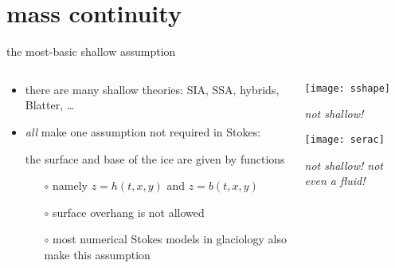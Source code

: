 
\section{mass continuity}

\begin{frame}{the most-basic shallow assumption}

\begin{columns}

\begin{column}{0.6\textwidth}
\begin{itemize}
\item there are many shallow theories: SIA, SSA, hybrids, Blatter, \dots
\item \emph{all} make one assumption not required in Stokes:

\begin{center}
\alert{the surface and base of the ice are given by functions}
\end{center}
    \begin{itemize}
    \item[$\circ$] namely $z=h(t,x,y)$ and $z=b(t,x,y)$
    \item[$\circ$] surface overhang is not allowed
    \item[$\circ$] most numerical Stokes models in glaciology also make this assumption
    \end{itemize}
\end{itemize}
\end{column}

\begin{column}{0.4\textwidth}
\texttt{[image: sshape]}

\scriptsize
\begin{center}
\emph{not shallow!}
\end{center}
\vspace{6mm}

\texttt{[image: serac]}

\begin{center}
\emph{not shallow! not even a fluid!}
\end{center}
\end{column}
\end{columns}
\end{frame}


